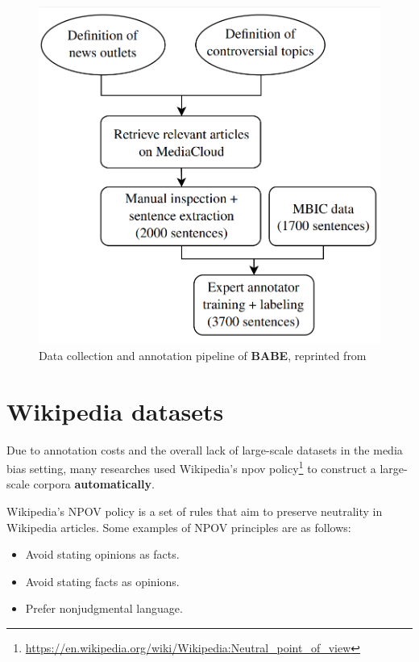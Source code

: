 \begin{figure}
  \includegraphics[scale=0.3]{my_modules/multimedia/babe_workflow.png}
  \caption{Data collection and annotation pipeline of \textbf{BABE}, reprinted from \cite{Spinde2021f}}
  \label{fig:babe-data}
\end{figure}
 \newpage



\section{Wikipedia datasets}\label{wiki-npov}
Due to annotation costs and the overall lack of large-scale datasets in the media bias setting, many researches \cite{pryzant2020automatically,recasens2013linguistic,hube2019neural} used Wikipedia's \Gls{npov} policy\footnote{\url{https://en.wikipedia.org/wiki/Wikipedia:Neutral_point_of_view}} to construct a large-scale corpora \textbf{automatically}. 

Wikipedia's NPOV policy is a set of rules that aim to preserve neutrality in Wikipedia articles. Some examples of NPOV principles are as follows:
\begin{itemize}
    \item Avoid stating opinions as facts.
    \item Avoid stating facts as opinions.
    \item Prefer nonjudgmental language.
\end{itemize}

